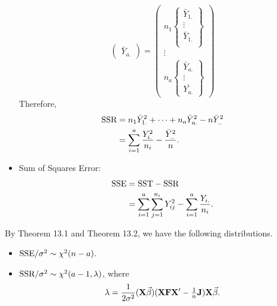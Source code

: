 \begin{itemize}
\[\begin{pmatrix}
                  \bar{Y}_{a.}
              \end{pmatrix}=\begin{pmatrix}
                  n_1\begin{Bmatrix}
                         \bar{Y}_{1.} \\
                         \vdots       \\
                         \bar{Y}_{1.} \\
                     \end{Bmatrix} \\
                  \vdots            \\
                  n_a\begin{Bmatrix}
                         \bar{Y}_{a.} \\
                         \vdots       \\
                         \bar{Y_{a.}}
                     \end{Bmatrix}
              \end{pmatrix} \]
          Therefore,
          \begin{align*}
              \text{SSR}
               & =n_1\bar{Y}_{1.}^2+\cdots+n_a\bar{Y}_{a.}^2-n\bar{Y}_{..}^2   \\
               & =\sum_{i=1}^{a}\frac{Y_{i.}^2}{n_i}-\frac{\bar{Y}_{..}^2}{n}.
          \end{align*}
    \item Sum of Squares Error:
          \begin{align*}
              \text{SSE}
               & =\text{SST}-\text{SSR}                                                                \\
               & =\sum_{i=1}^{a}\sum_{j=1}^{n_i}Y_{ij}^2-\sum_{i=1}^{a}\frac{Y_{i.}}{n_i}.
          \end{align*}
\end{itemize}
By Theorem 13.1 and Theorem 13.2, we have the following distributions.
\begin{itemize}
    \item $ \text{SSE}/\sigma^2 \sim \chi^2(n-a) $.
    \item $ \text{SSR}/\sigma^2 \sim \chi^2(a-1,\lambda) $, where
          \[ \lambda=\frac{1}{2\sigma^2}(\mathbf{X}\vec{\beta})(\mathbf{X}\mathbf{F}\mathbf{X}'-\tfrac{1}{n}\mathbf{J})\mathbf{X}\vec{\beta}. \]
\end{itemize}
